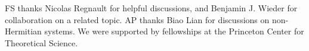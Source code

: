 \documentclass[aps,prl,twocolumn,amsmath,amssymb,floatfix,superscriptaddress]{revtex4-2}
\begin{document}
\begin{acknowledgments}
FS thanks Nicolas Regnault for helpful discussions, and Benjamin J. Wieder for collaboration on a related topic. AP thanks Biao Lian for discussions on non-Hermitian systems. We were supported by fellowships at the Princeton Center for Theoretical Science.
\end{acknowledgments}




\end{document}
